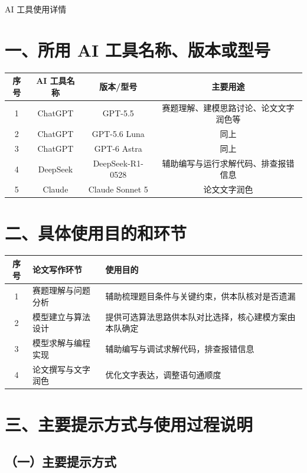 \documentclass[12pt, a4paper, scheme=chinese, fontset=windows]{ctexart}
\begin{document}
\begin{center}
{\heiti\Large AI 工具使用详情}
\end{center}
\vspace{0.5em}

\section*{一、所用 AI 工具名称、版本或型号}

\begin{longtable}{cccc}
\toprule
序号 & AI 工具名称 & 版本/型号 & 主要用途 \\
\midrule
\endhead
1 & ChatGPT & GPT-5.5 & 赛题理解、建模思路讨论、论文文字润色等 \\
2 & ChatGPT & GPT-5.6 Luna & 同上 \\
3 & ChatGPT & GPT-6 Astra & 同上 \\
4 & DeepSeek & DeepSeek-R1-0528 & 辅助编写与运行求解代码、排查报错信息 \\
5 & Claude & Claude Sonnet 5 & 论文文字润色 \\
\bottomrule
\end{longtable}

\section*{二、具体使用目的和环节}

\begin{longtable}{cp{3.6cm}p{6.5cm}}
\toprule
序号 & 论文写作环节 & 使用目的 \\
\midrule
\endhead
1 & 赛题理解与问题分析 & 辅助梳理题目条件与关键约束，供本队核对是否遗漏  \\
2 & 模型建立与算法设计 & 提供可选算法思路供本队对比选择，核心建模方案由本队确定  \\
3 & 模型求解与编程实现 & 辅助编写与调试求解代码，排查报错信息  \\
4 & 论文撰写与文字润色 & 优化文字表达，调整语句通顺度  \\
\bottomrule
\end{longtable}

\section*{三、主要提示方式与使用过程说明}

\subsection*{（一）主要提示方式}
\end{document}
